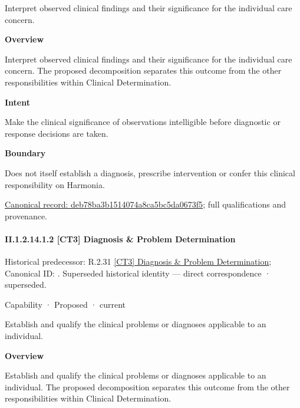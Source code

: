 Interpret observed clinical findings and their significance for the individual care concern.



\textbf{Overview}



Interpret observed clinical findings and their significance for the individual care concern. The proposed decomposition separates this outcome from the other responsibilities within Clinical Determination.



\textbf{Intent}



Make the clinical significance of observations intelligible before diagnostic or response decisions are taken.



\textbf{Boundary}



Does not itself establish a diagnosis, prescribe intervention or confer this clinical responsibility on Harmonia.


{\footnotesize \href{../../../../continuum/strategy/capability/deb78ba3b1514074a8ca5bc5da0673f5.md}{Canonical record: deb78ba3b1514074a8ca5bc5da0673f5}; full qualifications and provenance.}\par
\paragraph*{II.1.2.14.1.2 [CT3] Diagnosis \& Problem Determination}
\label{navigation:II.1.2.14.1.2}

{\small Historical predecessor: R.2.31 \hyperref[element:e575c583783546ef85cf898523d18797]{[CT3] Diagnosis \& Problem Determination}; Canonical ID: \texttt{}. Superseded historical identity — direct correspondence · superseded.}\par
\label{element:d965032637e64275b7a61c0413834590}
{\small Capability · Proposed · current}\par

Establish and qualify the clinical problems or diagnoses applicable to an individual.



\textbf{Overview}



Establish and qualify the clinical problems or diagnoses applicable to an individual. The proposed decomposition separates this outcome from the other responsibilities within Clinical Determination.



